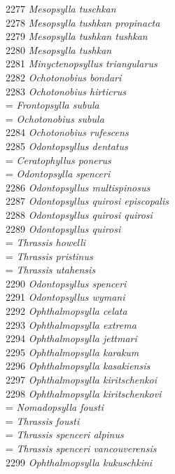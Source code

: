 \documentclass[
]{article}
\begin{document}
2277 \emph{Mesopsylla tuschkan}\\
2278 \emph{Mesopsylla tushkan propinacta}\\
2279 \emph{Mesopsylla tushkan tushkan}\\
2280 \emph{Mesopsylla tushkan}\\
2281 \emph{Minyctenopsyllus triangularus}\\
2282 \emph{Ochotonobius bondari}\\
2283 \emph{Ochotonobius hirticrus}\\
= \emph{Frontopsylla subula}\\
= \emph{Ochotonobius subula}\\
2284 \emph{Ochotonobius rufescens}\\
2285 \emph{Odontopsyllus dentatus}\\
= \emph{Ceratophyllus ponerus}\\
= \emph{Odontopsylla spenceri}\\
2286 \emph{Odontopsyllus multispinosus}\\
2287 \emph{Odontopsyllus quirosi episcopalis}\\
2288 \emph{Odontopsyllus quirosi quirosi}\\
2289 \emph{Odontopsyllus quirosi}\\
= \emph{Thrassis howelli}\\
= \emph{Thrassis pristinus}\\
= \emph{Thrassis utahensis}\\
2290 \emph{Odontopsyllus spenceri}\\
2291 \emph{Odontopsyllus wymani}\\
2292 \emph{Ophthalmopsylla celata}\\
2293 \emph{Ophthalmopsylla extrema}\\
2294 \emph{Ophthalmopsylla jettmari}\\
2295 \emph{Ophthalmopsylla karakum}\\
2296 \emph{Ophthalmopsylla kasakiensis}\\
2297 \emph{Ophthalmopsylla kiritschenkoi}\\
2298 \emph{Ophthalmopsylla kiritschenkovi}\\
= \emph{Nomadopsylla fousti}\\
= \emph{Thrassis fousti}\\
= \emph{Thrassis spenceri alpinus}\\
= \emph{Thrassis spenceri vancouverensis}\\
2299 \emph{Ophthalmopsylla kukuschkini}\\
\end{document}
